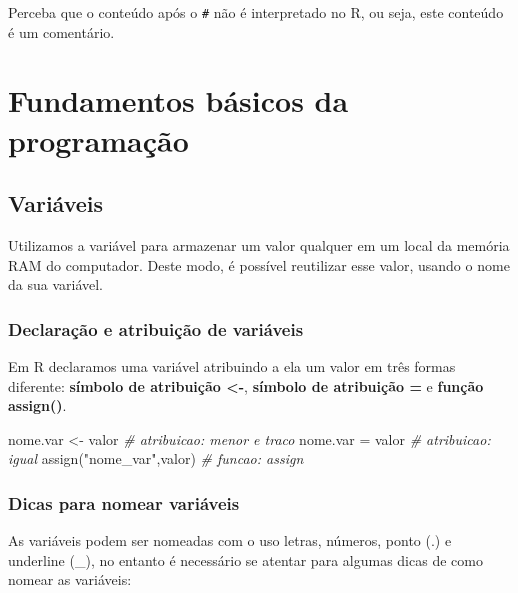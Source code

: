 \documentclass[
]{book}
\newenvironment{Shaded}{\begin{snugshade}}{\end{snugshade}}
\newcommand{\CommentTok}[1]{\textcolor[rgb]{0.56,0.35,0.01}{\textit{#1}}}
\newcommand{\FunctionTok}[1]{\textcolor[rgb]{0.00,0.00,0.00}{#1}}
\newcommand{\NormalTok}[1]{#1}
\newcommand{\OtherTok}[1]{\textcolor[rgb]{0.56,0.35,0.01}{#1}}
\newcommand{\StringTok}[1]{\textcolor[rgb]{0.31,0.60,0.02}{#1}}
\begin{document}
Perceba que o conteúdo após o \texttt{\#} não é interpretado no R, ou seja, este conteúdo é um comentário.

\hypertarget{fundamentos-buxe1sicos-da-programauxe7uxe3o}{%
\chapter{Fundamentos básicos da programação}\label{fundamentos-buxe1sicos-da-programauxe7uxe3o}}

\hypertarget{variuxe1veis}{%
\section{Variáveis}\label{variuxe1veis}}

Utilizamos a variável para armazenar um valor qualquer em um local da memória RAM do computador. Deste modo, é possível reutilizar esse valor, usando o nome da sua variável.

\hypertarget{declarauxe7uxe3o-e-atribuiuxe7uxe3o-de-variuxe1veis}{%
\subsection{Declaração e atribuição de variáveis}\label{declarauxe7uxe3o-e-atribuiuxe7uxe3o-de-variuxe1veis}}

Em R declaramos uma variável atribuindo a ela um valor em três formas diferente: \textbf{símbolo de atribuição \textless-}, \textbf{símbolo de atribuição =} e \textbf{função assign()}.

\begin{Shaded}
\begin{Highlighting}[]
\NormalTok{nome.var }\OtherTok{\textless{}{-}}\NormalTok{ valor }\CommentTok{\# atribuicao: menor e traco}
\NormalTok{nome.var }\OtherTok{=}\NormalTok{ valor }\CommentTok{\# atribuicao: igual}
\FunctionTok{assign}\NormalTok{(}\StringTok{"nome\_var"}\NormalTok{,valor) }\CommentTok{\# funcao: assign}
\end{Highlighting}
\end{Shaded}

\hypertarget{dicas-para-nomear-variuxe1veis}{%
\subsection{Dicas para nomear variáveis}\label{dicas-para-nomear-variuxe1veis}}

As variáveis podem ser nomeadas com o uso letras, números, ponto (.) e underline (\_), no entanto é necessário se atentar para algumas dicas de como nomear as variáveis:
\end{document}
